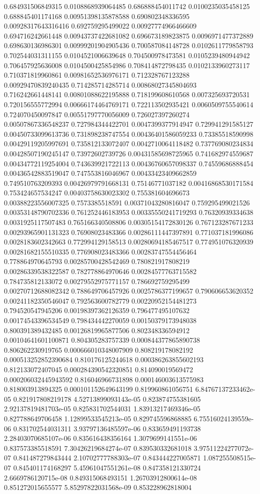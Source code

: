 \begin{table}
\begin{tabu}
\begin{sparkline}{10}
0.684931506849315 0.0108868939064485 0.686888454011742 0.0100235035458125 0.688845401174168 0.00951398135878588 0.690802348336595 0.00928317643316416 0.692759295499022 0.00927774966466609 0.694716242661448 0.00943737422681082 0.696673189823875 0.0096971477372889 0.698630136986301 0.00999201904905436 0.700587084148728 0.0102611779858793 0.702544031311155 0.0104521006639648 0.704500978473581 0.0105239480944942 0.706457925636008 0.0104500425854986 0.708414872798435 0.0102133960273117 0.710371819960861 0.00981652536976171 0.712328767123288 0.00929470839240435 0.714285714285714 0.00868027345804693 0.716242661448141 0.00801088622195888 0.718199608610568 0.007325693720531 0.720156555772994 0.00666174464769171 0.722113502935421 0.0060509755540614 0.724070450097847 0.00551797770056009 0.726027397260274 0.00507867336548237 0.727984344422701 0.0047399377914947 0.729941291585127 0.00450733099613736 0.731898238747554 0.00436401586059233 0.73385518590998 0.00429119205997691 0.735812133072407 0.0042710064118482 0.737769080234834 0.00428507190245147 0.73972602739726 0.00431585698725965 0.741682974559687 0.00434772119254004 0.743639921722113 0.00436760657098337 0.74559686888454 0.00436542883519047 0.747553816046967 0.00433423409662859 0.749510763209393 0.00426979791668131 0.75146771037182 0.00416868530171584 0.753424657534247 0.00403758630023302 0.755381604696673 0.00388223556007325 0.7573385518591 0.00371043280816047 0.759295499021526 0.00353148790702336 0.761252446183953 0.00335550241719293 0.76320939334638 0.0031925117507483 0.765166340508806 0.00305154172830126 0.767123287671233 0.00293965901131323 0.76908023483366 0.00286111447397891 0.771037181996086 0.0028183602342663 0.772994129158513 0.00280694185467517 0.774951076320939 0.00281682155510335 0.776908023483366 0.00283747554456464 0.778864970645793 0.00285700428542469 0.780821917808219 0.00286339538322587 0.782778864970646 0.00284577763715582 0.784735812133072 0.00279552975771157 0.786692759295499 0.00270712688082342 0.788649706457926 0.0025786377199657 0.790606653620352 0.00241182350546047 0.792563600782779 0.00220952154481273 0.794520547945206 0.00198397362126359 0.796477495107632 0.00174543396534549 0.798434442270059 0.00150379173948038 0.800391389432485 0.00126819965877506 0.802348336594912 0.00104641601100871 0.804305283757339 0.000844377865890738 0.806262230919765 0.000666010348007909 0.808219178082192 0.000513252852390684 0.810176125244618 0.000386263855602193 0.812133072407045 0.000284390542320851 0.814090019569472 0.000206032445943592 0.816046966731898 0.000146003613575983 0.818003913894325 0.000101152649643199 0.819960861056751 6.84767137233462e-05 0.821917808219178 4.52713899093143e-05 0.823874755381605 2.92137819481703e-05 0.825831702544031 1.83913217469346e-05 0.827788649706458 1.12899533545213e-05 0.829745596868885 6.75516024139559e-06 0.831702544031311 3.93797136485597e-06 0.833659491193738 2.28403070685107e-06 0.835616438356164 1.3079699141551e-06 0.837573385518591 7.30426219684274e-07 0.839530332681018 3.97511224277072e-07 0.841487279843444 2.10702777788303e-07 0.843444227005871 1.087255508515e-07 0.845401174168297 5.45961047551261e-08 0.847358121330724 2.6669786120715e-08 0.849315068493151 1.26703912800614e-08 0.851272015655577 5.85297822031568e-09 0.853228962818004 
\end{sparkline}
\end{tabu}
\end{table}
